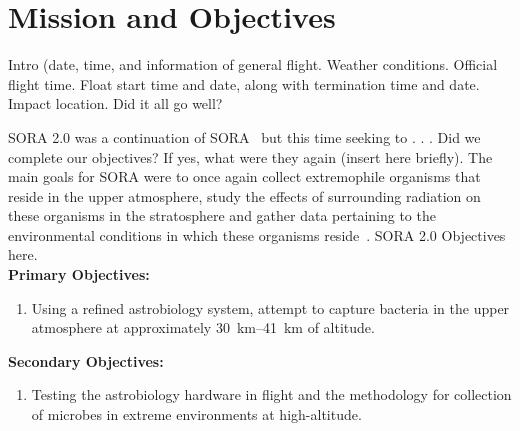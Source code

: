 \section{Mission and Objectives}
\label{sec:Introduction}

Intro (date, time, and information of general flight.  Weather conditions.  Official flight time.  Float start time and date, along with termination time and date.  Impact location.  Did it all go well?


SORA 2.0 was a continuation of SORA~\cite{SORA} but this time seeking to . . .
Did we complete our objectives?  If yes, what were they again (insert here briefly).  
The main goals for SORA were to once again collect extremophile organisms that reside in the upper atmosphere, study the effects of surrounding radiation on these organisms in the stratosphere and gather data pertaining to the environmental conditions in which these organisms reside~\cite{SORA}.  
SORA 2.0 Objectives here.\\
{\bf Primary Objectives:}
	\begin{enumerate}
	\item Using a refined astrobiology system, attempt to capture bacteria in the upper atmosphere at approximately \SIrange{30}{41}{\kilo\meter} of altitude.
	\end{enumerate}
{\bf Secondary Objectives:}
	\begin{enumerate}
	\item Testing the astrobiology hardware in flight and the methodology for collection of microbes in extreme environments at high-altitude.
	\end{enumerate}

